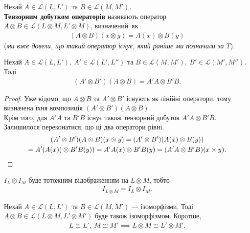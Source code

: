 \documentclass{math_library}
\begin{document}
\begin{definition}
Нехай $A \in \mathcal{L}(L,L')$ та $B \in \mathcal{L}(M,M')$.\\
\textbf{Тензорним добутком операторів} називають оператор $A \otimes B \in \mathcal{L}(L \otimes M, L' \otimes M)$, визначений~як
\begin{align*}
(A \otimes B)(x \otimes y) = A(x) \otimes B(y)
\end{align*}
(\textit{ми вже довели, що такий оператор існує, який раніше ми позначали за $T$}).
\end{definition}

\begin{proposition}
Нехай $A \in \mathcal{L}(L,L'),\ A' \in \mathcal{L}(L',L'')$ та $B \in \mathcal{L}(M,M'),\ B' \in \mathcal{L}(M',M'')$. Тоді
\begin{align*}
(A' \otimes B') (A \otimes B) = A'A \otimes B'B.
\end{align*}
\end{proposition}

\begin{proof}
Уже відомо, що $A \otimes B$ та $A' \otimes B'$ існують як лінійні оператори, тому визначена їхня композиція $(A' \otimes B') (A \otimes B)$.\\
Крім того, для $A'A$ та $B'B$ існує також тензорний добуток $A'A \otimes B'B$. Залишилося переконатися, що ці два оператори рівні.
\begin{multline*}
(A' \otimes B')(A \otimes B)(x \otimes y) = (A' \otimes B')(A(x) \otimes B(y)) \\ = A'(A(x)) \otimes B'B(y)) = A'A(x) \otimes B'B(y) = (A'A \otimes B'B)(x \times y). \qedhere
\end{multline*}
\end{proof}

\begin{corollary}
$I_L \otimes I_M$ буде тотожним відображенням на $L \otimes M$, тобто
\begin{align*}
I_{L \otimes M} = I_{L} \otimes I_M.
\end{align*}
\end{corollary}

\begin{corollary}
Нехай $A \in \mathcal{L}(L,L')$ та $B \in \mathcal{L}(M,M')$ --- ізоморфізми. Тоді $A \otimes B \in \mathcal{L}(L \otimes M, L' \otimes M')$ буде також ізоморфізмом. Коротше,
\begin{align*}
L \cong L',\ M \cong M' \implies L \otimes M \cong L' \otimes M'.
\end{align*}
\end{corollary}
\end{document}
